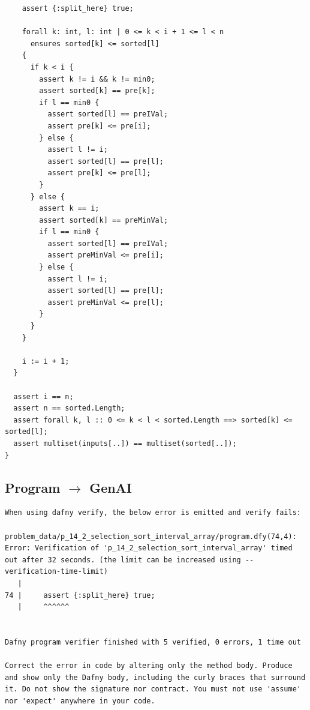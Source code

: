 \documentclass{article}
\begin{document}
\begin{lstlisting}
    assert {:split_here} true;

    forall k: int, l: int | 0 <= k < i + 1 <= l < n
      ensures sorted[k] <= sorted[l]
    {
      if k < i {
        assert k != i && k != min0;
        assert sorted[k] == pre[k];
        if l == min0 {
          assert sorted[l] == preIVal;
          assert pre[k] <= pre[i];
        } else {
          assert l != i;
          assert sorted[l] == pre[l];
          assert pre[k] <= pre[l];
        }
      } else {
        assert k == i;
        assert sorted[k] == preMinVal;
        if l == min0 {
          assert sorted[l] == preIVal;
          assert preMinVal <= pre[i];
        } else {
          assert l != i;
          assert sorted[l] == pre[l];
          assert preMinVal <= pre[l];
        }
      }
    }

    i := i + 1;
  }

  assert i == n;
  assert n == sorted.Length;
  assert forall k, l :: 0 <= k < l < sorted.Length ==> sorted[k] <= sorted[l];
  assert multiset(inputs[..]) == multiset(sorted[..]);
}
\end{lstlisting}
\subsection*{Program $\rightarrow$ GenAI}
\begin{lstlisting}
When using dafny verify, the below error is emitted and verify fails:

problem_data/p_14_2_selection_sort_interval_array/program.dfy(74,4): Error: Verification of 'p_14_2_selection_sort_interval_array' timed out after 32 seconds. (the limit can be increased using --verification-time-limit)
   |
74 |     assert {:split_here} true;
   |     ^^^^^^


Dafny program verifier finished with 5 verified, 0 errors, 1 time out

Correct the error in code by altering only the method body. Produce and show only the Dafny body, including the curly braces that surround it. Do not show the signature nor contract. You must not use 'assume' nor 'expect' anywhere in your code.
\end{lstlisting}
\end{document}
